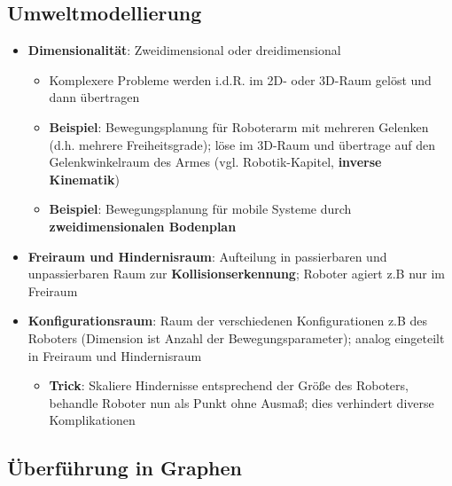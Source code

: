 \subsection{Umweltmodellierung}%
\label{grep:sub:umweltmodellierung}

\begin{itemize}
	\item \textbf{Dimensionalität}: Zweidimensional oder dreidimensional
	\begin{itemize}
		\item Komplexere Probleme werden i.d.R. im 2D- oder 3D-Raum gelöst und dann übertragen 
		\item \textbf{Beispiel}: Bewegungsplanung für Roboterarm mit mehreren Gelenken (d.h. mehrere Freiheitsgrade); löse im 3D-Raum und übertrage auf den Gelenkwinkelraum des Armes (vgl. Robotik-Kapitel, \textbf{inverse Kinematik})
		\item \textbf{Beispiel}: Bewegungsplanung für mobile Systeme durch \textbf{zweidimensionalen Bodenplan}
	\end{itemize}
	\item \textbf{Freiraum und Hindernisraum}: Aufteilung in passierbaren und unpassierbaren Raum zur \textbf{Kollisionserkennung}; Roboter agiert z.B nur im Freiraum
	\item \textbf{Konfigurationsraum}: Raum der verschiedenen Konfigurationen z.B des Roboters (Dimension ist Anzahl der Bewegungsparameter); analog eingeteilt in Freiraum und Hindernisraum
	\begin{itemize}
		\item \textbf{Trick}: Skaliere Hindernisse entsprechend der Größe des Roboters, behandle Roboter nun als Punkt ohne Ausmaß; dies verhindert diverse Komplikationen
	\end{itemize}
\end{itemize}

\subsection{Überführung in Graphen}%
\label{grep:sub:ueberfuehrung_in_graphen}

